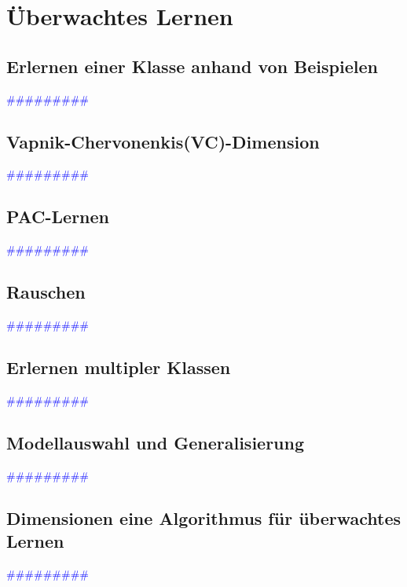 \documentclass{article}
\begin{document}
\newpage
\section{Überwachtes Lernen} %
  \subsection{Erlernen einer Klasse anhand von Beispielen} %
      \textcolor{blue}{\#\#\#\#\#\#\#\#\#}
  \subsection{Vapnik-Chervonenkis(VC)-Dimension} %
      \textcolor{blue}{\#\#\#\#\#\#\#\#\#}
  \subsection{PAC-Lernen} %
      \textcolor{blue}{\#\#\#\#\#\#\#\#\#}
  \subsection{Rauschen} %
      \textcolor{blue}{\#\#\#\#\#\#\#\#\#}
  \subsection{Erlernen multipler Klassen} %
      \textcolor{blue}{\#\#\#\#\#\#\#\#\#}
  \subsection{Modellauswahl und Generalisierung} %
      \textcolor{blue}{\#\#\#\#\#\#\#\#\#}
  \subsection{Dimensionen eine Algorithmus für überwachtes Lernen} %
      \textcolor{blue}{\#\#\#\#\#\#\#\#\#}
\end{document}
